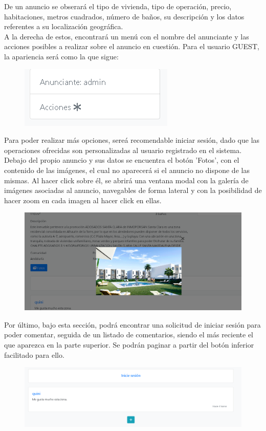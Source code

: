 De un anuncio se obserar\'{a} el tipo de vivienda, tipo de operaci\'{o}n, precio, habitaciones, metros cuadrados, n\'{u}mero de ba\~{n}os, su descripci\'{o}n y los datos referentes a su localizaci\'{o}n geogr\'{a}fica.\\

A la derecha de estos, encontrar\'{a} un men\'{u} con el nombre del anunciante y las acciones posibles a realizar sobre el anuncio en cuesti\'{o}n. Para el usuario GUEST, la apariencia ser\'{a} como la que sigue:

\begin{figure}[h!]
\centering
\includegraphics[width=.4\textwidth]{Img/ManualUsuario/LAGERAL_AD_GUEST.png}
\end{figure}

Para poder realizar m\'{a}s opciones, sere\'{a} recomendable iniciar sesi\'{o}n, dado que las operaciones ofrecidas son personalizadas al usuario registrado en el sistema.\\

Debajo del propio anuncio y sus datos se encuentra el bot\'{o}n 'Fotos', con el contenido de las im\'{a}genes, el cual no aparecer\'{a} si el anuncio no dispone de las mismas. Al hacer click sobre \'{e}l, se abrir\'{a} una ventana modal con la galer\'{i}a de im\'{a}genes asociadas al anuncio, navegables de forma lateral y con la posibilidad de hacer zoom en cada imagen al hacer click en ellas.

\begin{figure}[h!]
\centering
\includegraphics[width=.7\textwidth]{Img/ManualUsuario/GALERIA_GUEST.png}
\end{figure}

Por \'{u}ltimo, bajo esta secci\'{o}n, podr\'{a} encontrar una solicitud de iniciar sesi\'{o}n para poder comentar, seguida de un listado de comentarios, siendo el m\'{a}s reciente el que aparezca en la parte superior. Se podr\'{a}n paginar a partir del bot\'{o}n inferior facilitado para ello.

\begin{figure}[h!]
\centering
\includegraphics[width=.7\textwidth]{Img/ManualUsuario/COMENTARIOS_GUEST.png}
\end{figure}
